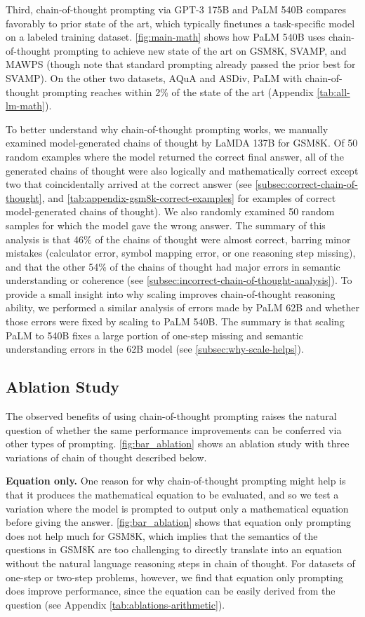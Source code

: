 Third, chain-of-thought prompting via GPT-3 175B and PaLM 540B compares favorably to prior state of the art, which typically finetunes a task-specific model on a labeled training dataset. 
\ref{fig:main-math} shows how PaLM 540B uses chain-of-thought prompting to achieve new state of the art on GSM8K, SVAMP, and MAWPS (though note that standard prompting already passed the prior best for SVAMP). On the other two datasets, AQuA and ASDiv, PaLM with chain-of-thought prompting reaches within 2\% of the state of the art (Appendix \ref{tab:all-lm-math}).

To better understand why chain-of-thought prompting works, we manually examined model-generated chains of thought by LaMDA 137B for GSM8K. Of 50 random examples where the model returned the correct final answer, all of the generated chains of thought were also logically and mathematically correct except two that coincidentally arrived at the correct answer (see \ref{subsec:correct-chain-of-thought}, and \ref{tab:appendix-gsm8k-correct-examples} for examples of correct model-generated chains of thought). We also randomly examined 50 random samples for which the model gave the wrong answer. The summary of this analysis is that 46\% of the chains of thought were almost correct, barring minor mistakes (calculator error, symbol mapping error, or one reasoning step missing), and that the other 54\% of the chains of thought had major errors in semantic understanding or coherence (see \ref{subsec:incorrect-chain-of-thought-analysis}). 
To provide a small insight into why scaling improves chain-of-thought reasoning ability, we performed a similar analysis of errors made by PaLM 62B and whether those errors were fixed by scaling to PaLM 540B. The summary is that scaling PaLM to 540B fixes a large portion of one-step missing and semantic understanding errors in the 62B model (see \ref{subsec:why-scale-helps}).

\subsection{Ablation Study}\label{subsec:math-ablation}

The observed benefits of using chain-of-thought prompting raises the natural question of whether the same performance improvements can be conferred via other types of prompting.
\ref{fig:bar_ablation} shows an ablation study with three variations of chain of thought described below.

\textbf{Equation only.} One reason for why chain-of-thought prompting might help is that it produces the mathematical equation to be evaluated, and so we test a variation where the model is prompted to output only a mathematical equation before giving the answer. 
\ref{fig:bar_ablation} shows that equation only prompting does not help much for GSM8K, which implies that the semantics of the questions in GSM8K are too challenging to directly translate into an equation without the natural language reasoning steps in chain of thought. For datasets of one-step or two-step problems, however, we find that equation only prompting does improve performance, since the equation can be easily derived from the question (see Appendix \ref{tab:ablations-arithmetic}). 


